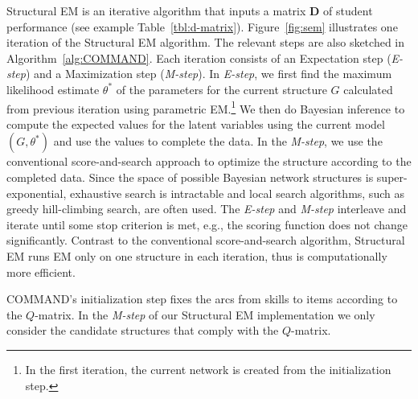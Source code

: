 \documentclass{edm_template}
\begin{document}
Structural EM is an iterative algorithm that  inputs a matrix $\mathbf{D}$ of student performance (see example Table~\ref{tbl:d-matrix}). %
Figure~\ref{fig:sem} illustrates one iteration of the Structural EM algorithm. The relevant steps are also sketched in Algorithm~\ref{alg:COMMAND}. 
Each iteration consists of an Expectation step (\emph{E-step}) and a Maximization step (\emph{M-step}). 
In \emph{E-step}, we first find the maximum likelihood estimate $\theta^*$ of the parameters 
for the current structure $G$ calculated from previous iteration using parametric EM.\footnote{In the first iteration, the current network is created from the initialization step.}
We then do Bayesian inference to compute the expected values for the latent variables using the current model $(G,\theta^*)$
and use the values to complete the data.
In the \emph{M-step}, we use the conventional score-and-search approach to optimize the structure according to the completed data.
Since the space of possible Bayesian network structures is super-exponential, 
exhaustive search is intractable and local search algorithms, such as greedy hill-climbing search, are often used.
The \emph{E-step} and \emph{M-step} interleave and iterate until some stop criterion is met, e.g., the scoring function does not change significantly.
Contrast to the conventional score-and-search algorithm, Structural EM runs EM only on one structure in each iteration, thus is computationally more efficient.

COMMAND's  initialization step
fixes the arcs from skills to items according to the ${Q}$-matrix.
In  the \emph{M-step} of our Structural EM implementation we only consider the candidate structures that comply with the ${Q}$-matrix.
\end{document}
